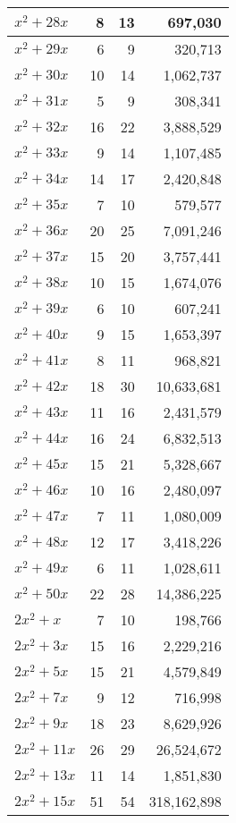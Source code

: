 \documentclass[a4paper]{amsproc}
\theoremstyle{plain}
\begin{document}
\begin{longtable}{ | l | r | r | r | }
$x^2 + 28x$ & 8 & 13 & 697{,}030 \\ \hline
$x^2 + 29x$ & 6 & 9 & 320{,}713 \\ \hline
$x^2 + 30x$ & 10 & 14 & 1{,}062{,}737 \\ \hline
$x^2 + 31x$ & 5 & 9 & 308{,}341 \\ \hline
$x^2 + 32x$ & 16 & 22 & 3{,}888{,}529 \\ \hline
$x^2 + 33x$ & 9 & 14 & 1{,}107{,}485 \\ \hline
$x^2 + 34x$ & 14 & 17 & 2{,}420{,}848 \\ \hline
$x^2 + 35x$ & 7 & 10 & 579{,}577 \\ \hline
$x^2 + 36x$ & 20 & 25 & 7{,}091{,}246 \\ \hline
$x^2 + 37x$ & 15 & 20 & 3{,}757{,}441 \\ \hline
$x^2 + 38x$ & 10 & 15 & 1{,}674{,}076 \\ \hline
$x^2 + 39x$ & 6 & 10 & 607{,}241 \\ \hline
$x^2 + 40x$ & 9 & 15 & 1{,}653{,}397 \\ \hline
$x^2 + 41x$ & 8 & 11 & 968{,}821 \\ \hline
$x^2 + 42x$ & 18 & 30 & 10{,}633{,}681 \\ \hline
$x^2 + 43x$ & 11 & 16 & 2{,}431{,}579 \\ \hline
$x^2 + 44x$ & 16 & 24 & 6{,}832{,}513 \\ \hline
$x^2 + 45x$ & 15 & 21 & 5{,}328{,}667 \\ \hline
$x^2 + 46x$ & 10 & 16 & 2{,}480{,}097 \\ \hline
$x^2 + 47x$ & 7 & 11 & 1{,}080{,}009 \\ \hline
$x^2 + 48x$ & 12 & 17 & 3{,}418{,}226 \\ \hline
$x^2 + 49x$ & 6 & 11 & 1{,}028{,}611 \\ \hline
$x^2 + 50x$ & 22 & 28 & 14{,}386{,}225 \\ \hline
$2x^2 + x$ & 7 & 10 & 198{,}766 \\ \hline
$2x^2 + 3x$ & 15 & 16 & 2{,}229{,}216 \\ \hline
$2x^2 + 5x$ & 15 & 21 & 4{,}579{,}849 \\ \hline
$2x^2 + 7x$ & 9 & 12 & 716{,}998 \\ \hline
$2x^2 + 9x$ & 18 & 23 & 8{,}629{,}926 \\ \hline
$2x^2 + 11x$ & 26 & 29 & 26{,}524{,}672 \\ \hline
$2x^2 + 13x$ & 11 & 14 & 1{,}851{,}830 \\ \hline
$2x^2 + 15x$ & 51 & 54 & 318{,}162{,}898 \\ \hline

\end{longtable}
\end{document}
